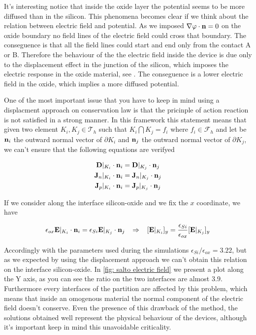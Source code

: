\vspace{0.5cm}

It's interesting notice that inside the oxide layer the potential seems to be more diffused than in the silicon. This phenomena becomes clear if we think about the relation  between electric field and potential.
 As we imposed $\nabla \varphi \cdot \mathbf{n}=0$ on the oxide boundary no field lines of the electric field could cross that boundary. The conseguence is that all the field lines could start and end only from the contact A or B.
Therefore the behaviour of the the electric field inside the device is due only to the displacement effect in the junction of the silicon, which imposes the electric response in the oxide material, see . The conseguence is a lower electric field in the oxide, which implies a more diffused potential.


One of the most important issue that you have to keep in mind using a displacment approach on conservation law is that the pricinple of action reaction is not satisfied in a strong manner.
In this framework this statement means that given two element $K_i,K_j\in \mathcal{T}_h$ such that $K_i \bigcap K_j = f_i$ where $f_i \in \mathcal{F}_h$ and let be  $\mathbf{n}_{i}$ the outward normal vector of $\partial K_i$ and $\mathbf{n}_{j}$ the outward normal vector of $\partial K_j$,  we can't ensure that the following equations are verifyed

\begin{align}
\mathbf{D}|_{K_i}\cdot \mathbf{n}_{i} & = \mathbf{D}|_{K_j} \cdot \mathbf{n}_{j} \label{eq: conservazione vettore spostamento}\\
\mathbf{J}_n|_{K_i}\cdot \mathbf{n}_{i} & = \mathbf{J}_n|_{K_j}\cdot \mathbf{n}_{j} \\
\mathbf{J}_p|_{K_i}\cdot \mathbf{n}_{i} & = \mathbf{J}_p|_{K_j}\cdot \mathbf{n}_{j} 
\end{align}


If we consider  along the interface silicon-oxide and we fix the $x$ coordinate, we have

\begin{equation}
\epsilon_{ox}\vect{E}|_{K_i}\cdot \vect{n}_{i} = \epsilon_{Si}\vect{E}|_{K_j} \cdot \vect{n}_{j} \psp{5} \Rightarrow \psp{5}  [\vect{E}|_{K_i}]_y = \dfrac{\epsilon_{Si}}{\epsilon_{ox}}[\vect{E}|_{K_j}]_y
\end{equation}  

Accordingly with the parameters used during the simulations $\epsilon_{Si}/\epsilon_{ox}=3.22$, but as we expected by using the displacement approach we can't obtain this relation on the interface silicon-oxide. In \ref{fig: salto electric field} we present a plot along the Y axis, as you can see the ratio on the two interfaces are almost $3.9$. Furthermore every interfaces of the partition are affected by this problem, which means that inside an omogenous material the normal component of the electric field doesn't conserve. Even the presence of this drawback of the method, the solutions obtained well represent the physical behaviour of the devices, although it's important keep in mind this unavoidable criticality.

